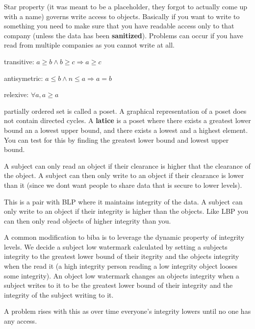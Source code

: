 \documentclass{article}
\begin{document}
Star property (it was meant to be a placeholder, they forgot to actually come up with a name) governs write access to objects. Basically if you want to write to something you need to make sure that you have readable access only to that company (unless the data has been \textbf{sanitized}). Problems can occur if you have read from multiple companies as you cannot write at all.




transitive: 	$a \ge b \wedge b \ge c \Rightarrow a \ge c$

antisymetric: 	$a \le b \wedge n \le a \Rightarrow a = b$

relexive: 		$\forall a, a \ge a$

partially ordered set is called a poset. A graphical representation of a poset does not contain directed cycles. A \textbf{latice} is a poset where there exists a greatest lower bound an a lowest upper bound, and there exists a lowest and a highest element. You can test for this by finding the greatest lower bound and lowest upper bound. 



A subject can only read an object if their clearance is higher that the clearance of the object. A subject can then only write to an object if their clearance is lower than it (since we dont want people to share data that is secure to lower levels).


This is a pair with BLP where it maintains integrity of the data. A subject can only write to an object if their integrity is higher than the objects. Like LBP you can then only read objects of higher integrity than you.


A common modification to biba is to leverage the dynamic property of integrity levels. We decide a subject low watermark calculated by setting a subjects integrity to the greatest lower bound of their itegrity and the objects integrity when the read it (a high integrity person reading a low integrity object looses some integrity). An object low watermark changes an objects integrity when a subject writes to it to be the greatest lower bound of their integrity and the integrity of the subject writing to it.

A problem rises with this as over time everyone's integrity lowers until no one has any access.




\end{document}
